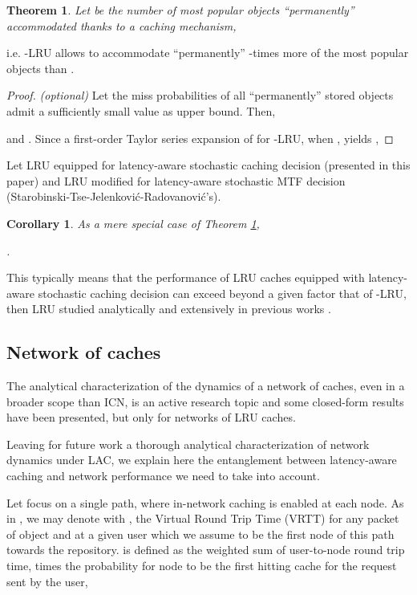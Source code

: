 \documentclass[conference]{IEEEtran}
\newtheorem{theorem}{Theorem}
\newtheorem{corollary}{Corollary}[theorem]
\begin{document}
\begin{theorem}
\label{theorem_asym_gt_sym}
Let  be the number of most popular objects ``permanently'' accommodated thanks to a caching mechanism,

\end{theorem}
i.e. -LRU allows to accommodate ``permanently'' -times more of the most popular objects than . 
\begin{proof}\textit{(optional)}
Let the miss probabilities of all ``permanently'' stored objects admit a sufficiently small value  as upper bound.
Then, 

and 
.
Since a first-order Taylor series expansion of  for -LRU, when , yields
,



\end{proof}
Let  LRU equipped for latency-aware stochastic caching decision (presented in this paper) 
and   LRU modified for latency-aware stochastic MTF decision (Starobinski-Tse-Jelenkovi\'c-Radovanovi\'c's).
\begin{corollary}
\label{corollary_asym_gt_sym}
As a mere special case of Theorem \ref{theorem_asym_gt_sym}, 

.
\end{corollary}

This typically means that the performance of LRU caches equipped with latency-aware stochastic caching decision can exceed beyond a given factor  that of -LRU, then LRU studied analytically and extensively in previous works \cite{Carofiglio:2013:PBS:2542828.2542992}.


\subsection{Network of caches}
\label{subsec:network_of_caches}

The analytical characterization of the dynamics of a network of caches, even in a broader scope than ICN, is an active research topic \cite{DBLP:journals/icl/Blefari-MelazziBCD14} \cite{Rosensweig:2010:AMG:1833515.1833684}\cite{journals/corr/JinYKSYHL13} and some closed-form results have been presented, but only for networks of LRU caches\cite{Carofiglio:2013:PBS:2542828.2542992}. 


Leaving for future work a thorough analytical characterization of network dynamics under LAC, we explain here the entanglement between latency-aware caching and network performance we need to take into account.

Let focus on a single path, where in-network caching is enabled at each node.
As in \cite{ITC,Carofiglio:2013:PBS:2542828.2542992}, we may denote with , the Virtual Round Trip Time (VRTT) for any packet of object  and at a given user which we assume to be the first node of this path towards the repository.  is defined as the weighted sum of user-to-node  round trip time,  times the probability for node  to be the first hitting cache for the request sent by the user, 
\end{document}
